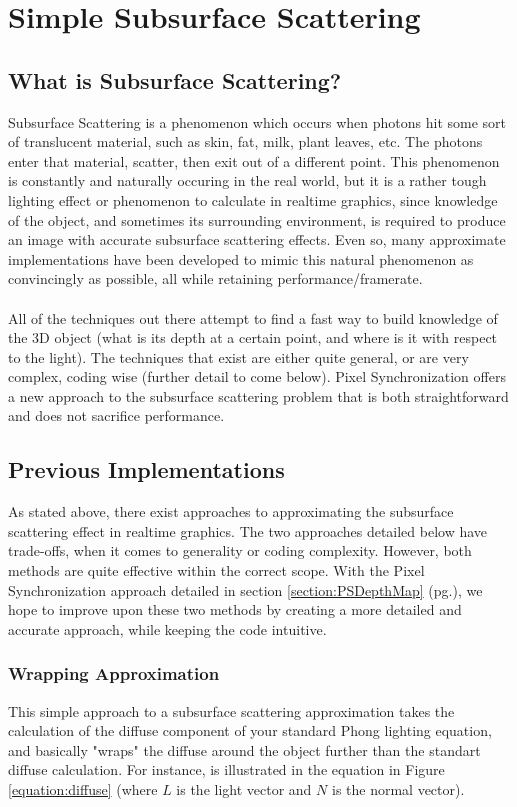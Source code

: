 \documentclass[a4paper, 12pt]{article}
\begin{document}
\section{Simple Subsurface Scattering}

\subsection{What is Subsurface Scattering?}

Subsurface Scattering is a phenomenon which occurs when photons hit some sort
of translucent material, such as skin, fat, milk, plant leaves, etc. The
photons enter that material, scatter, then exit out of a different point. This
phenomenon is constantly and naturally occuring in the real world, but it is a
rather tough lighting effect or phenomenon to calculate in realtime graphics,
since knowledge of the object, and sometimes its surrounding environment, is
required to produce an image with accurate subsurface scattering effects. Even
so, many approximate implementations have been developed to mimic this natural
phenomenon as convincingly as possible, all while retaining
performance/framerate. \\ \\ All of the techniques out there attempt to find a
fast way to build knowledge of the 3D object (what is its depth at a certain
point, and where is it with respect to the light). The techniques that exist
are either quite general, or are very complex, coding wise (further detail to
come below). Pixel Synchronization offers a new approach to the subsurface
scattering problem that is both straightforward and does not sacrifice
performance.

\subsection{Previous Implementations}

As stated above, there exist approaches to approximating the subsurface
scattering effect in realtime graphics. The two approaches detailed below have
trade-offs, when it comes to generality or coding complexity. However, both
methods are quite effective within the correct scope. With the Pixel
Synchronization approach detailed in section 
\ref{section:PSDepthMap} (pg.\pageref{section:PSDepthMap}), we hope to improve
upon these two methods by creating a more detailed and accurate approach,
while keeping the code intuitive.

\subsubsection{Wrapping Approximation}
\label{section:wrapping}
This simple approach to a subsurface scattering approximation takes the
calculation of the diffuse component of your standard Phong lighting equation,
and basically "wraps" the diffuse around the object further than the standart
diffuse calculation. For instance, is illustrated in the equation in Figure
\ref{equation:diffuse} (where $L$ is the light vector and $N$ is the normal
vector).
\end{document}
